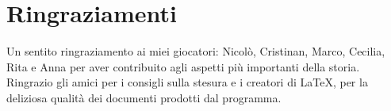 
\begingroup
\let\clearpage\relax
\let\cleardoublepage\relax
\let\cleardoublepage\relax

\chapter*{Ringraziamenti}
Un sentito ringraziamento ai miei giocatori: Nicol\`o, Cristinan, Marco, Cecilia, Rita e Anna per aver contribuito agli aspetti pi\`u importanti della storia. Ringrazio gli amici per i consigli sulla stesura e i creatori di \LaTeX, per la deliziosa qualit\`a dei documenti prodotti dal programma.
\endgroup



